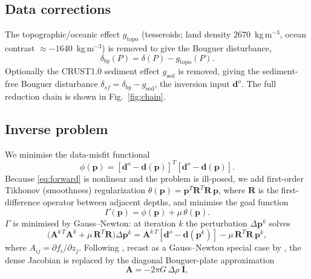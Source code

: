 \documentclass[extra,mreferee]{gji}
\begin{document}
\subsection{Data corrections}
The topographic/oceanic effect $g_{\text{topo}}$ (tesseroids; land density
$2670$~kg\,m$^{-3}$, ocean contrast $\approx-1640$~kg\,m$^{-3}$) is removed to give
the Bouguer disturbance,
\begin{equation}
\delta_{bg}(P) = \delta(P) - g_{\text{topo}}(P).
\label{eq:bouguer}
\end{equation}
Optionally the {CRUST1.0} sediment effect $g_{\text{sed}}$ is removed, giving the
sediment-free Bouguer disturbance
$\delta_{sf}=\delta_{bg}-g_{\text{sed}}$, the inversion input $\mathbf{d}^{o}$.
The full reduction chain is shown in Fig.~\ref{fig:chain}.

\subsection{Inverse problem}
We minimise the data-misfit functional
\begin{equation}
\phi(\mathbf{p}) = [\mathbf{d}^{o}-\mathbf{d}(\mathbf{p})]^{T}
                   [\mathbf{d}^{o}-\mathbf{d}(\mathbf{p})].
\label{eq:misfit}
\end{equation}
Because \eqref{eq:forward} is nonlinear and the problem is ill-posed, we add
first-order Tikhonov (smoothness) regularization
$\theta(\mathbf{p})=\mathbf{p}^{T}\mathbf{R}^{T}\mathbf{R}\,\mathbf{p}$, where
$\mathbf{R}$ is the first-difference operator between adjacent depths, and
minimise the goal function
\begin{equation}
\Gamma(\mathbf{p}) = \phi(\mathbf{p}) + \mu\,\theta(\mathbf{p}).
\label{eq:goal}
\end{equation}
$\Gamma$ is minimised by Gauss--Newton: at iteration $k$ the perturbation
$\Delta\mathbf{p}^{k}$ solves
\begin{equation}
\big(\mathbf{A}^{k\,T}\mathbf{A}^{k} + \mu\,\mathbf{R}^{T}\mathbf{R}\big)
   \Delta\mathbf{p}^{k} =
   \mathbf{A}^{k\,T}[\mathbf{d}^{o}-\mathbf{d}(\mathbf{p}^{k})]
   - \mu\,\mathbf{R}^{T}\mathbf{R}\,\mathbf{p}^{k},
\label{eq:gaussnewton}
\end{equation}
where $A_{ij}=\partial f_i/\partial z_j$. Following \citet{bott1960}, recast as a
Gauss--Newton special case by \citet{silva2014}, the dense Jacobian is replaced by
the diagonal Bouguer-plate approximation
\begin{equation}
\mathbf{A} = -2\pi G\,\Delta\rho\;\mathbf{I},
\label{eq:jacobian}
\end{equation}
\end{document}
